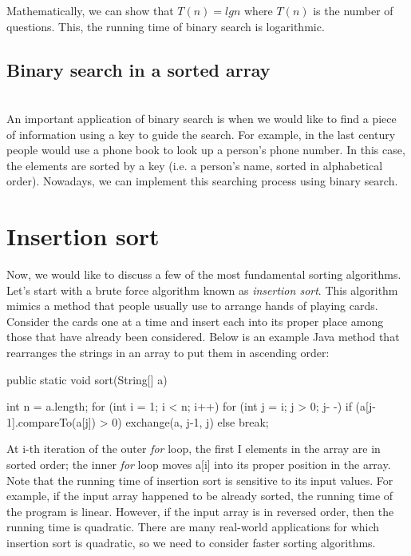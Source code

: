 
 Mathematically, we can show that $T(n) = lg n$ where $T(n)$ is the number of questions. This, the running time of binary search is logarithmic.

\subsection{Binary search in a sorted array} \\
An important application of binary search is when we would like to find a piece of information using a key to guide the search. For example, in the last century people would use a phone book to look up a person’s phone number. In this case, the elements are sorted by a key (i.e. a person’s name, sorted in alphabetical order). Nowadays, we can implement this searching process using binary search.



\section{Insertion sort}

Now, we would like to discuss a few of the most fundamental sorting algorithms. 
Let’s start with a brute force algorithm known as \textit{insertion sort}. This algorithm mimics a method that people usually use to arrange hands of playing cards. Consider the cards one at a time and insert each into its proper place among those that have already been considered. Below is an example Java method that rearranges the strings in an array to put them in ascending order:

\begin{code}
public static void sort(String[] a)
{
	int n = a.length;
	for (int i = 1; i < n; i++)
		for (int j = i; j > 0; j- -)
			if (a[j-1].compareTo(a[j]) > 0)
				exchange(a, j-1, j)
			else break;

}
 
\end{code}
 
 
 At i-th iteration of the outer \textit{for} loop, the first I elements in the array are in sorted order; the inner \textit{for} loop moves a[i] into its proper position in the array. Note that the running time of insertion sort is sensitive to its input values. For example, if the input array happened to be already sorted, the running time of the program is linear. However, if the input array is in reversed order, then the running time is quadratic. There are many real-world applications for which insertion sort is quadratic, so we need to consider faster sorting algorithms.

